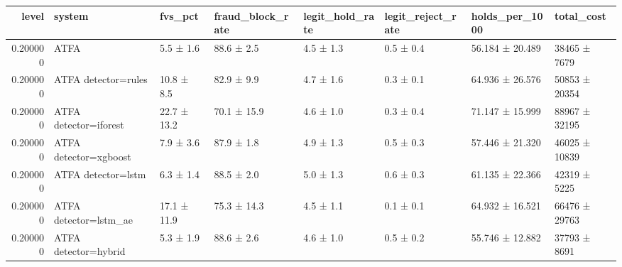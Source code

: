 \begin{tabular}{rlllllll}
\toprule
level & system & fvs\_pct & fraud\_block\_rate & legit\_hold\_rate & legit\_reject\_rate & holds\_per\_1000 & total\_cost \\
\midrule
0.200000 & ATFA & 5.5 ± 1.6 & 88.6 ± 2.5 & 4.5 ± 1.3 & 0.5 ± 0.4 & 56.184 ± 20.489 & 38465 ± 7679 \\
0.200000 & ATFA detector=rules & 10.8 ± 8.5 & 82.9 ± 9.9 & 4.7 ± 1.6 & 0.3 ± 0.1 & 64.936 ± 26.576 & 50853 ± 20354 \\
0.200000 & ATFA detector=iforest & 22.7 ± 13.2 & 70.1 ± 15.9 & 4.6 ± 1.0 & 0.3 ± 0.4 & 71.147 ± 15.999 & 88967 ± 32195 \\
0.200000 & ATFA detector=xgboost & 7.9 ± 3.6 & 87.9 ± 1.8 & 4.9 ± 1.3 & 0.5 ± 0.3 & 57.446 ± 21.320 & 46025 ± 10839 \\
0.200000 & ATFA detector=lstm & 6.3 ± 1.4 & 88.5 ± 2.0 & 5.0 ± 1.3 & 0.6 ± 0.3 & 61.135 ± 22.366 & 42319 ± 5225 \\
0.200000 & ATFA detector=lstm\_ae & 17.1 ± 11.9 & 75.3 ± 14.3 & 4.5 ± 1.1 & 0.1 ± 0.1 & 64.932 ± 16.521 & 66476 ± 29763 \\
0.200000 & ATFA detector=hybrid & 5.3 ± 1.9 & 88.6 ± 2.6 & 4.6 ± 1.0 & 0.5 ± 0.2 & 55.746 ± 12.882 & 37793 ± 8691 \\
\bottomrule
\end{tabular}
